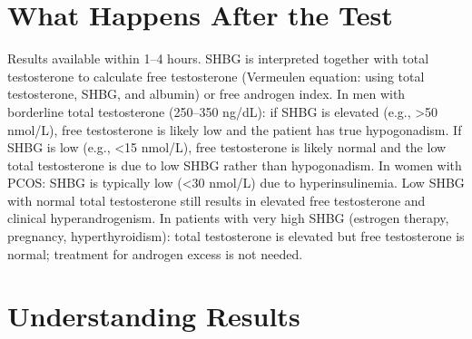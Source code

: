 \section*{What Happens After the Test}
Results available within 1--4 hours. SHBG is interpreted together with total testosterone to calculate free testosterone (Vermeulen equation: using total testosterone, SHBG, and albumin) or free androgen index. In men with borderline total testosterone (250--350 ng/dL): if SHBG is elevated (e.g., >50 nmol/L), free testosterone is likely low and the patient has true hypogonadism. If SHBG is low (e.g., <15 nmol/L), free testosterone is likely normal and the low total testosterone is due to low SHBG rather than hypogonadism. In women with PCOS: SHBG is typically low (<30 nmol/L) due to hyperinsulinemia. Low SHBG with normal total testosterone still results in elevated free testosterone and clinical hyperandrogenism. In patients with very high SHBG (estrogen therapy, pregnancy, hyperthyroidism): total testosterone is elevated but free testosterone is normal; treatment for androgen excess is not needed.

\section*{Understanding Results}

